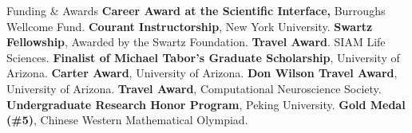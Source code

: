 \begin{rubric}{Funding \& Awards}
\entry*[Applying] \textbf{Career Award at the Scientific Interface,} Burroughs Wellcome Fund. 
%
\entry*[2021 - 2023] \textbf{Courant Instructorship}, New York University.
\entry*[2020-2021] \textbf{Swartz Fellowship}, Awarded by the Swartz Foundation.
\entry*[2020] \textbf{Travel Award}. SIAM Life Sciences.
\entry*[2019] \textbf{Finalist of Michael Tabor's Graduate Scholarship}, University of Arizona.
\entry*[2019] \textbf{Carter Award}, University of Arizona.
\entry*[2018-2019] \textbf{Don Wilson Travel Award}, University of Arizona.
\entry*[2018] \textbf{Travel Award}, Computational Neuroscience Society.
\entry*[2013-2016] \textbf{Undergraduate Research Honor Program}, Peking University.
\entry*[2010] \textbf{Gold Medal (\#5)}, Chinese Western Mathematical Olympiad.
\end{rubric}